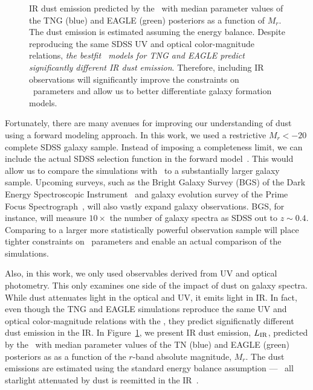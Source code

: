 \begin{figure}
\begin{center}
    \caption{\label{fig:lir}
    IR dust emission predicted by the \eda~with median parameter values of the
    TNG (blue) and EAGLE (green) posteriors as a function of $M_r$. The dust
    emission is estimated assuming the \cite{dacunha2008} energy balance. 
    Despite reproducing the same SDSS UV and optical color-magnitude relations, 
    \emph{the bestfit \eda~models for TNG and EAGLE predict significantly different
    IR dust emission}. Therefore, including IR observations will significantly
    improve the constraints on \eda~parameters and allow us to better differentiate 
    galaxy formation models. 
    }
\end{center}
\end{figure}

Fortunately, there are many avenues for improving our understanding of dust
using a forward modeling approach. In this work, we used a restrictive $M_r <
-20$ complete SDSS galaxy sample. Instead of imposing a completeness limit, 
we can include the actual SDSS selection function in the forward 
model~\citep[\eg~][]{dickey2020}. This would allow us to compare the
simulations with \eda~to a substantially larger galaxy sample. Upcoming
surveys, such as the Bright Galaxy Survey (BGS) of the Dark Energy
Spectroscopic Instrument~\citep[DESI;][]{desicollaboration2016, ruiz-macias2020} 
and galaxy evolution survey of the Prime Focus
Spectrograph~\citep[PFS;][]{takada2014,tamura2016}, will also vastly expand galaxy
observations. BGS, for instance, will measure $10\times$ the number of galaxy
spectra as SDSS out to $z\sim0.4$. Comparing to a larger more statistically
powerful observation sample will place tighter constraints on \eda~parameters
and enable an actual comparison of the simulations. 

Also, in this work, we only used observables derived from UV and optical
photometry. This only examines one side of the impact of dust on galaxy
spectra. While dust attenuates light in the optical and UV, it emits light in
IR. In fact, even though the TNG and EAGLE simulations reproduce the same UV and
optical color-magnitude relations with the \eda, they predict significnatly 
different dust emission in the IR. In Figure~\ref{fig:lir}, we present IR dust
emission, $L_{\rm IR}$, predicted by the \eda~with median parameter values of 
the TN (blue) and EAGLE (green) posteriors as as a function of the $r$-band 
absolute magnitude, $M_r$. The dust emissions are estimated using the standard
energy balance assumption --- \ie~all starlight attenuated by dust is reemitted 
in the IR~\citep{dacunha2008}. 

